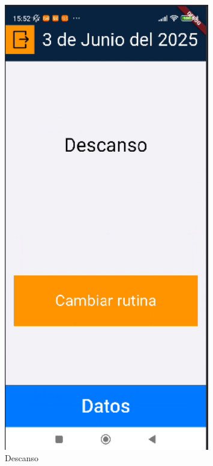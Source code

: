 \begin{figure}[H]
   \centering
    \includegraphics[width=0.8\textwidth]{pantallas/descanso.png}
    \caption{Descanso}
    \label{fig:Descanso}
\end{figure}

